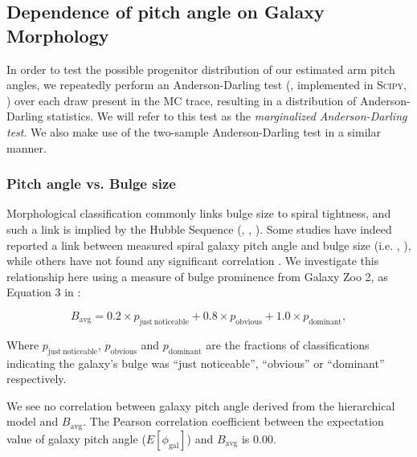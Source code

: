 
\subsection{Dependence of pitch angle on Galaxy Morphology}
\label{section:morphology_comparision}

In order to test the possible progenitor distribution of our estimated arm pitch angles, we repeatedly perform an Anderson-Darling test (\citealt{10.2307/2286009}, implemented in \textsc{Scipy}, \citealt{scipy-paper}) over each draw present in the MC trace, resulting in a distribution of Anderson-Darling statistics. We will refer to this test as the \textit{marginalized Anderson-Darling test}. We also make use of the two-sample Anderson-Darling \citep{doi:10.1080/01621459.1987.10478517} test in a similar manner.

\subsubsection{Pitch angle vs. Bulge size}

Morphological classification commonly links bulge size to spiral tightness, and such a link is implied by the Hubble Sequence (\citealt{2005ARA&A..43..581S}, \citealt{2009MNRAS.393.1531G}, \citealt{2013seg..book..155B}). Some studies have indeed reported a link between measured spiral galaxy pitch angle and bulge size (i.e. \citealt{2017MNRAS.472.2263H}, \citealt{2019ApJ...873...85D}), while others have not found any significant correlation \citep{2019MNRAS.487.1808M}. We investigate this relationship here using a measure of bulge prominence from Galaxy Zoo 2, as Equation 3 in \citet{2019MNRAS.487.1808M}:

\begin{equation}
  B_\mathrm{avg} = 0.2\times p_\mathrm{just\ noticeable} + 0.8\times p_\mathrm{obvious} + 1.0\times p_\mathrm{dominant},
\end{equation}

Where $p_\mathrm{just\ noticeable}$, $p_\mathrm{obvious}$ and $p_\mathrm{dominant}$ are the fractions of classifications indicating the galaxy's bulge was ``just noticeable'', ``obvious'' or ``dominant'' respectively.

We see no correlation between galaxy pitch angle derived from the hierarchical model and $B_\mathrm{avg}$. The Pearson correlation coefficient between the expectation value of galaxy pitch angle ($E[\phi_\mathrm{gal}]$) and $B_\mathrm{avg}$ is 0.00.

